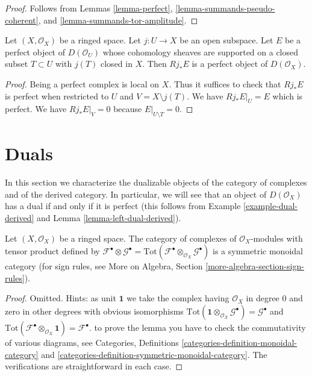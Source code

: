 \begin{proof}
Follows from
Lemmas \ref{lemma-perfect}, \ref{lemma-summands-pseudo-coherent}, and
\ref{lemma-summands-tor-amplitude}.
\end{proof}

\begin{lemma}
\label{lemma-pushforward-perfect}
Let $(X, \mathcal{O}_X)$ be a ringed space. Let $j : U \to X$ be an
open subspace. Let $E$ be a perfect object of $D(\mathcal{O}_U)$
whose cohomology
sheaves are supported on a closed subset $T \subset U$ with $j(T)$
closed in $X$. Then $Rj_*E$ is a perfect object of $D(\mathcal{O}_X)$.
\end{lemma}

\begin{proof}
Being a perfect complex is local on $X$. Thus it suffices to check that
$Rj_*E$ is perfect when restricted to $U$ and $V = X \setminus j(T)$.
We have $Rj_*E|_U = E$ which is perfect. We have
 $Rj_*E|_V = 0$ because $E|_{U \setminus T} = 0$.
\end{proof}






\section{Duals}
\label{section-duals}

\noindent
In this section we characterize the dualizable objects of
the category of complexes and of the derived category.
In particular, we will see that an object of $D(\mathcal{O}_X)$
has a dual if and only if it is perfect (this follows from
Example \ref{example-dual-derived} and
Lemma \ref{lemma-left-dual-derived}).

\begin{lemma}
\label{lemma-symmetric-monoidal-cat-complexes}
Let $(X, \mathcal{O}_X)$ be a ringed space. The category of complexes
of $\mathcal{O}_X$-modules with tensor product defined by
$\mathcal{F}^\bullet \otimes \mathcal{G}^\bullet =
\text{Tot}(\mathcal{F}^\bullet \otimes_{\mathcal{O}_X} \mathcal{G}^\bullet)$
is a symmetric monoidal category (for sign rules, see
More on Algebra, Section \ref{more-algebra-section-sign-rules}).
\end{lemma}

\begin{proof}
Omitted. Hints: as unit $\mathbf{1}$ we take the complex having
$\mathcal{O}_X$ in degree $0$ and zero in other degrees with
obvious isomorphisms
$\text{Tot}(\mathbf{1} \otimes_{\mathcal{O}_X} \mathcal{G}^\bullet) =
\mathcal{G}^\bullet$ and
$\text{Tot}(\mathcal{F}^\bullet \otimes_{\mathcal{O}_X} \mathbf{1}) =
\mathcal{F}^\bullet$.
to prove the lemma you have to check the commutativity
of various diagrams, see Categories, Definitions
\ref{categories-definition-monoidal-category} and
\ref{categories-definition-symmetric-monoidal-category}.
The verifications are straightforward in each case.
\end{proof}

